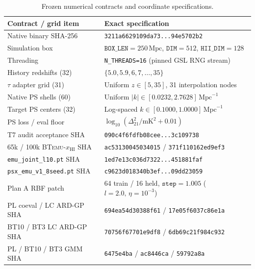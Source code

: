 \documentclass[aps,prd,reprint,superscriptaddress,nofootinbib,amsmath,amssymb,floatfix,longbibliography]{revtex4-2}
\begin{document}
\begin{table}[!tbp]
\caption{Frozen numerical contracts and coordinate specifications.}
\label{tab:provenance}
\footnotesize
\setlength{\tabcolsep}{3.5pt}
\begin{ruledtabular}
\begin{tabular}{p{3.05cm}p{4.83cm}}
Contract / grid item & Exact specification \\
\hline
Native binary SHA-256 & \texttt{3211a6629109da73...94e5702b2} \\
Simulation box & $\texttt{BOX\_LEN}=250\,\mathrm{Mpc}$, $\texttt{DIM}=512$, $\texttt{HII\_DIM}=128$ \\
Threading & \texttt{N\_THREADS=16} (pinned GSL RNG stream) \\
History redshifts (32) & $\{5.0, 5.9, 6, 7, \dots, 35\}$ \\
$\tau$ adapter grid (31) & Uniform $z \in [5, 35]$, 31 interpolation nodes \\
Native PS shells (60) & Uniform $|k| \in [0.0232, 2.7628]\,\mathrm{Mpc}^{-1}$ \\
Target PS centers (32) & Log-spaced $k \in [0.1000, 1.0000]\,\mathrm{Mpc}^{-1}$ \\
PS loss / eval floor & $\log_{10}(\Delta^2_{21}/\mathrm{mK}^2 + 0.01)$ \\
T7 audit acceptance SHA & \texttt{090c4f6fdfb08cee...3c109738} \\
65k / 100k \textsc{BTemu}-$x_{\mathrm{HI}}$ SHA & \texttt{ac53130045034015} / \texttt{371f110162ed9ef3} \\
\texttt{emu\_joint\_l10.pt} SHA & \texttt{1ed7e13c036d7322...451881faf} \\
\texttt{psx\_emu\_v1\_8seed.pt} SHA & \texttt{c9623d018340b3ef...09dd23059} \\
Plan A RBF patch & 64 train / 16 held, $\texttt{step}=1.005$ ($l=2.0,\,\eta=10^{-3}$) \\
PL coeval / LC ARD-GP SHA & \texttt{694ea54d30388f61} / \texttt{17e05f6037c86e1a} \\
BT10 / BT3 LC ARD-GP SHA & \texttt{70756f67701e9df8} / \texttt{6db69c21f984c932} \\
PL / BT10 / BT3 GMM SHA & \texttt{6475e4ba} / \texttt{ac8446ca} / \texttt{59792a8a} \\
\end{tabular}
\end{ruledtabular}
\end{table}


\end{document}
